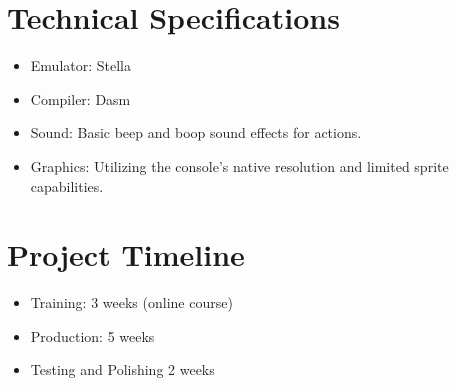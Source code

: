 \documentclass{article}
\begin{document}
\section{Technical Specifications}
    \begin{itemize}
      \item Emulator: Stella
      \item  Compiler: Dasm
      \item  Sound: Basic beep and boop sound effects for actions.
      \item  Graphics: Utilizing the console's native resolution and limited sprite capabilities.
    \end{itemize}



\section{Project Timeline}
    \begin{itemize}
      \item Training: 3 weeks (online course)
      \item  Production: 5 weeks
      \item  Testing and Polishing 2 weeks
    \end{itemize}
\end{document}
